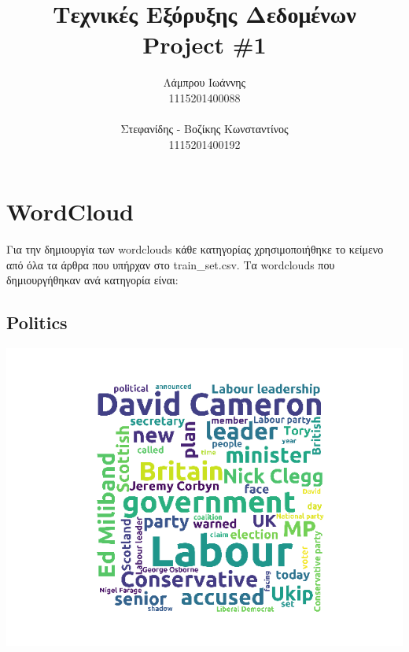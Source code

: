 \documentclass{article}
\begin{document}
\title{\vspace{-3.5cm}\textbf{Τεχνικές Εξόρυξης Δεδομένων \\ \textlatin{Project \#}1}}
\author{Λάμπρου Ιωάννης \\1115201400088\\\\ Στεφανίδης - Βοζίκης Κωνσταντίνος \\1115201400192}

\maketitle
\section{\textlatin{WordCloud}}
Για την δημιουργία των \textlatin{wordclouds} κάθε κατηγορίας χρησιμοποιήθηκε το κείμενο από όλα τα άρθρα
που υπήρχαν στο \textlatin{train\_set.csv}. Τα \textlatin{wordclouds} που δημιουργήθηκαν ανά κατηγορία είναι: \\
\subsection*{\textlatin{Politics}}
\includegraphics[scale=0.6]{Poli}
\end{document}
